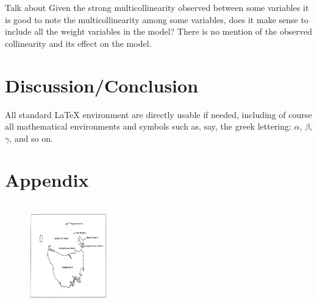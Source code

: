 \documentclass[letterpaper,9pt,twocolumn,twoside,]{pinp}
\begin{document}
Talk about Given the strong multicollinearity observed between some
variables it is good to note the multicollinearity among some variables,
does it make sense to include all the weight variables in the model?
There is no mention of the observed collinearity and its effect on the
model.

\section{Discussion/Conclusion}\label{discussionconclusion}

All standard LaTeX environment are directly usable if needed, including
of course all mathematical environments and symbols such as, say, the
greek lettering: \(\alpha\), \(\beta\), \(\gamma\), and so on.

\section{Appendix}\label{appendix}

\begin{figure}[!h]
    \begin{center}
    \includegraphics[width=0.3\textwidth, height=1.8in]{Independence} 
    \end{center}
\end{figure}


\pnasbreak 
\end{document}
